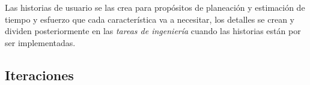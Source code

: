        Las historias de usuario se las crea para propósitos de planeación y estimación de tiempo y esfuerzo que cada característica va a necesitar, los detalles se crean y dividen posteriormente en las \emph{tareas de ingeniería} cuando las historias están por ser implementadas. \\






         \subsection{Iteraciones}
         \label{sub:iteracion}

